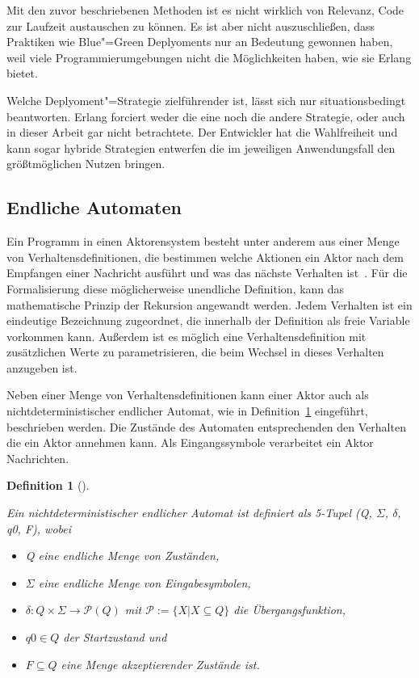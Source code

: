 Mit den zuvor beschriebenen Methoden ist es nicht wirklich von Relevanz, Code zur Laufzeit austauschen zu können. Es ist aber nicht auszuschließen, dass Praktiken wie Blue"=Green Deplyoments \usw nur an Bedeutung gewonnen haben, weil viele Programmierumgebungen nicht die Möglichkeiten haben, wie sie Erlang bietet.

Welche Deplyoment"=Strategie zielführender ist, lässt sich nur situationsbedingt beantworten. Erlang forciert weder die eine noch die andere Strategie, oder auch in dieser Arbeit gar nicht betrachtete. Der Entwickler hat die Wahlfreiheit und kann sogar hybride Strategien entwerfen die im jeweiligen Anwendungsfall den größtmöglichen Nutzen bringen.

\subsection{Endliche Automaten}

Ein Programm in einen Aktorensystem besteht unter anderem aus einer Menge von Verhaltensdefinitionen, die bestimmen welche Aktionen ein Aktor nach dem Empfangen einer Nachricht ausführt und was das nächste Verhalten ist~\cite[30]{Agha:1986:AMC:7929}. Für die Formalisierung diese möglicherweise unendliche Definition, kann das mathematische Prinzip der Rekursion angewandt werden. Jedem Verhalten ist ein eindeutige Bezeichnung zugeordnet, die innerhalb der Definition als freie Variable vorkommen kann. Außerdem ist es möglich eine Verhaltensdefinition mit zusätzlichen Werte zu parametrisieren, die beim Wechsel in dieses Verhalten anzugeben ist.

Neben einer Menge von Verhaltensdefinitionen kann einer Aktor auch als nichtdeterministischer endlicher Automat, wie in Definition~\ref{def:nfs} eingeführt, beschrieben werden. Die Zustände des Automaten entsprechenden den Verhalten die ein Aktor annehmen kann. Als Eingangssymbole verarbeitet ein Aktor Nachrichten.

\newtheorem{nfstheorem}{Definition}[section]

\begin{nfstheorem}[{{\cite[87]{hopcroft2003}}}]
\label{def:nfs}

Ein nichtdeterministischer endlicher Automat ist definiert als 5-Tupel (Q, $\Sigma$, $\delta$, q0, F), wobei

\begin{itemize}
	\item Q eine endliche Menge von Zuständen,
	\item $\Sigma$ eine endliche Menge von Eingabesymbolen,
	\item $\delta : Q \times \Sigma \rightarrow \mathcal{P}(Q)$ mit $\mathcal{P} := \{ X | X \subseteq Q \}$ die Übergangsfunktion,
	\item $q0 \in Q$ der Startzustand und
	\item $F \subseteq Q$ eine Menge akzeptierender Zustände ist.
\end{itemize}

\end{nfstheorem}


